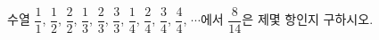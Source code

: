 \hspace*{2mm}\begin{minipage}[t]{\dimexpr\linewidth-2mm\relax}\vspace{0pt}
수열 $\dfrac{1}{1}$, $\dfrac{1}{2}$, $\dfrac{2}{2}$, $\dfrac{1}{3}$, $\dfrac{2}{3}$, $\dfrac{3}{3}$, $\dfrac{1}{4}$, $\dfrac{2}{4}$, $\dfrac{3}{4}$, $\dfrac{4}{4}$, $\cdots$에서 $\dfrac{8}{14}$은 제몇 항인지 구하시오.\end{minipage}
